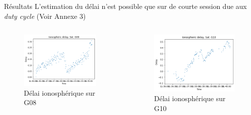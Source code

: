 \documentclass[xcolor=dvipsnames,envcountsect]{beamer}
\begin{document}
\begin{frame}{Résultats}
	L'estimation du délai n'est possible que sur de courte session due aux \textit{duty cycle} {\tiny (Voir Annexe 3)}
	\begin{columns}
	\begin{column}{0.5\textwidth}
		\begin{figure}
			\includegraphics[width=0.9\textwidth]{./Figures/iono_G08.png}
			\caption {Délai ionosphérique sur G08}
		\end{figure}
	\end{column}

	\begin{column}{0.5\textwidth}
		\begin{figure}
			\includegraphics[width=1\textwidth]{./Figures/iono_G10.png}
			\caption {Délai ionosphérique sur G10}
		\end{figure}
	\end{column}
	\end{columns}
\end{frame}
\end{document}
